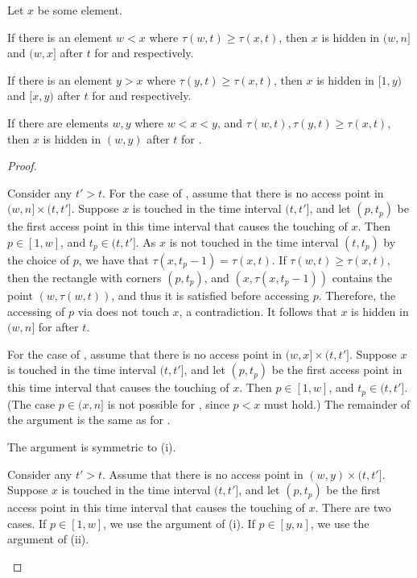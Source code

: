 \begin{lemma} 
Let $x$ be some element.
\begin{compactenum}[(i)]
\item If there is an element $w<x$ where $\tau(w,t)\ge\tau(x,t)$, then
$x$ is hidden in $(w,n]$ and $(w,x]$ after $t$ for \greedy and \greedyright respectively.
\item If there is an element $y>x$ where $\tau(y,t)\ge\tau(x,t)$, then
$x$ is hidden in $[1,y)$ and $[x,y)$ after $t$ for \greedy and \greedyleft respectively.
\item If there are elements $w,y$ where $w<x<y$, and $\tau(w,t),\tau(y,t)\ge\tau(x,t)$, then
$x$ is hidden in $(w,y)$ after $t$ for \greedy.
\end{compactenum}
\end{lemma}
\begin{proof}
\begin{compactenum}[(i)]
\item Consider any $t'>t$. For the case of \greedy, assume that there is no access point in $(w,n] \times (t,t']$. Suppose $x$ is touched in the time interval $(t,t']$, and let $(p,t_p)$ be the first access point in this time interval that causes the touching of $x$. Then $p \in [1,w]$, and $t_p \in (t,t']$. As $x$ is not touched in the time interval $(t,t_p)$ by the choice of $p$, we have that $\tau(x,t_p-1) = \tau(x,t)$. If $\tau(w,t)\ge\tau(x,t)$, then the rectangle with corners $(p,t_p)$, and $(x,\tau(x,t_p-1))$ contains the point $(w,\tau(w,t))$, and thus it is satisfied before accessing $p$. Therefore, the accessing of $p$ via \greedy does not touch $x$, a contradiction. It follows that $x$ is hidden in $(w,n]$ for \greedy after $t$.

For the case of \greedyright, assume that there is no access point in $(w,x] \times (t,t']$. Suppose $x$ is touched in the time interval $(t,t']$, and let $(p,t_p)$ be the first access point in this time interval that causes the touching of $x$. Then $p \in [1,w]$, and $t_p \in (t,t']$. (The case $p \in (x,n]$ is not possible for \greedyright, since $p<x$ must hold.) The remainder of the argument is the same as for \greedy.

\item The argument is symmetric to (i). 
\item Consider any $t'>t$. Assume that there is no access point in $(w,y) \times (t,t']$. Suppose $x$ is touched in the time interval $(t,t']$, and let $(p,t_p)$ be the first access point in this time interval that causes the touching of $x$. There are two cases. If $p \in [1,w]$, we use the argument of (i). If $p \in [y,n]$, we use the argument of (ii).
\end{compactenum}
\end{proof}

